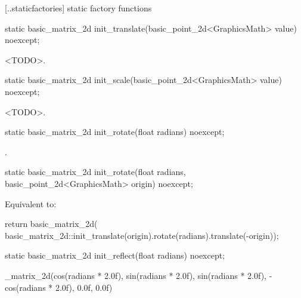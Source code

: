  [\iotwod.\matrixtwod.staticfactories] { static factory 
functions}

%
\begin{itemdecl}
static basic_matrix_2d init_translate(basic_point_2d<GraphicsMath> value) noexcept;
\end{itemdecl}
\begin{itemdescr}
\pnum
\returns
<TODO>.
\end{itemdescr}

%
\begin{itemdecl}
static basic_matrix_2d init_scale(basic_point_2d<GraphicsMath> value) noexcept;
\end{itemdecl}
\begin{itemdescr}
\pnum
\returns
<TODO>.
\end{itemdescr}

%
\begin{itemdecl}
static basic_matrix_2d init_rotate(float radians) noexcept;
\end{itemdecl}
\begin{itemdescr}
\pnum
\returns
{}.
\end{itemdescr}

%
\begin{itemdecl}
static basic_matrix_2d init_rotate(float radians, basic_point_2d<GraphicsMath> origin) noexcept;
\end{itemdecl}
\begin{itemdescr}
\pnum
\effects
Equivalent to:
\begin{codeblock}
return basic_matrix_2d(
  basic_matrix_2d::init_translate(origin).rotate(radians).translate(-origin));
\end{codeblock}
\end{itemdescr}

%
\begin{itemdecl}
static basic_matrix_2d init_reflect(float radians) noexcept;
\end{itemdecl}
\begin{itemdescr}
\pnum
\returns
\tcodebasic_matrix_2d(cos(radians * 2.0f), sin(radians * 2.0f), sin(radians * 2.0f),
  -cos(radians * 2.0f), 0.0f, 0.0f)
\end{itemdescr}

